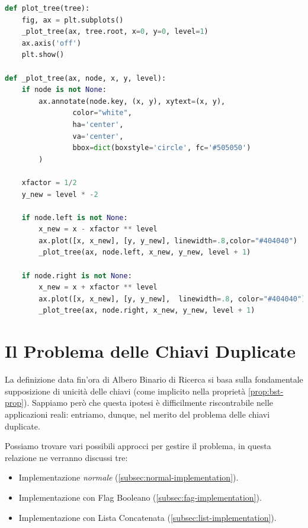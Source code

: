 \documentclass{article}
\begin{document}
\begin{lstlisting}[language=Python, caption={Rappresentazione Grfaica di un BST}, label={lst:plot_tree}]
def plot_tree(tree):
    fig, ax = plt.subplots()
    _plot_tree(ax, tree.root, x=0, y=0, level=1)
    ax.axis('off')
    plt.show()

def _plot_tree(ax, node, x, y, level):
    if node is not None:
        ax.annotate(node.key, (x, y), xytext=(x, y),
                color="white",    
                ha='center',
                va='center', 
                bbox=dict(boxstyle='circle', fc='#505050')
        )

    xfactor = 1/2
    y_new = level * -2

    if node.left is not None:
        x_new = x - xfactor ** level
        ax.plot([x, x_new], [y, y_new], linewidth=.8,color="#404040")
        _plot_tree(ax, node.left, x_new, y_new, level + 1)

    if node.right is not None:
        x_new = x + xfactor ** level
        ax.plot([x, x_new], [y, y_new],  linewidth=.8, color="#404040")
        _plot_tree(ax, node.right, x_new, y_new, level + 1)
\end{lstlisting}


\section{Il Problema delle Chiavi Duplicate}
La definizione data fin'ora di Albero Binario di Ricerca si basa sulla fondamentale supposizione di unicità delle chiavi
(come implicito nella proprietà \ref{prop:bst-prop}).
Sappiamo però che questa ipotesi è difficilmente riscontrabile nelle applicazioni reali:
entriamo, dunque, nel merito del problema delle chiavi duplicate.

Possiamo trovare vari possibili approcci per gestire il problema, in questa relazione ne verranno discussi tre:  



\begin{itemize}
	\item Implementazione \textit{normale} (\ref{subsec:normal-implementation}).
	\item Implementazione con Flag Booleano (\ref{subsec:fag-implementation}).
	\item Implementazione con Lista Concatenata (\ref{subsec:list-implementation}).
\end{itemize}
\end{document}
